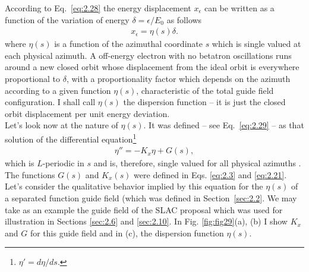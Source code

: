 According to Eq.~\eqref{eq:2.28} the energy displacement $x_\epsilon$ can be written as a function of the variation of energy $\delta = \epsilon/E_0$ as follows
\begin{align} \label{eq:3.3}
	x_\epsilon = \eta(s) \delta.
\end{align}
where $\eta(s)$ is a function of the azimuthal coordinate $s$ which is single valued at
each physical azimuth. A off-energy electron with no betatron oscillations runs around a new closed orbit whose displacement from the ideal orbit is everywhere proportional to $\delta$, with a proportionality factor which depends on the azimuth according to a given function $\eta(s)$, characteristic of the total guide field configuration. I shall call $\eta(s)$ the dispersion function -- it is just the closed orbit displacement per unit energy deviation.\\
Let's look now at the nature of $\eta(s)$. It was defined -- see Eq.~\eqref{eq:2.29} -- as that
solution of the differential equation\footnote{$\eta' = d\eta/ds.$}
\begin{align}\label{eq:3.4}
	\eta'' = -K_x\eta + G(s),
\end{align}
which is $L$-periodic in $s$ and is, therefore, single valued for all physical azimuths . The functions $G(s)$ and $K_x(s)$ were defined in Eqs. \eqref{eq:2.3} and \eqref{eq:2.21}.\\
Let’s consider the qualitative behavior implied by this equation for the $\eta(s)$ of a separated function guide field (which was defined in Section~\ref{sec:2.2}. We may take
as an example the guide field of the SLAC proposal which was used for illustration in Sections \ref{sec:2.6} and \ref{sec:2.10}. In Fig. \ref{fig:fig29}(a), (b) I show $K_x$ and $G$ for this guide field and in (c), the dispersion function $\eta(s)$.
